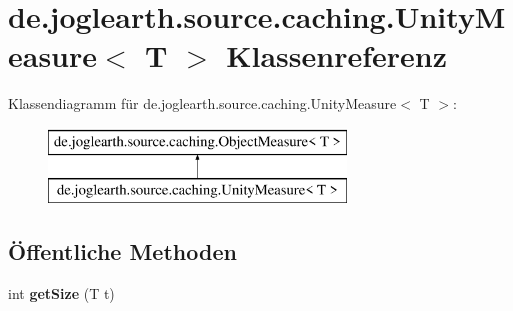 \section{de.\-joglearth.\-source.\-caching.\-Unity\-Measure$<$ T $>$ Klassenreferenz}
\label{classde_1_1joglearth_1_1source_1_1caching_1_1_unity_measure_3_01_t_01_4}
Klassendiagramm für de.\-joglearth.\-source.\-caching.\-Unity\-Measure$<$ T $>$\-:\begin{figure}[H]
\begin{center}
\leavevmode
\includegraphics[height=2.000000cm]{classde_1_1joglearth_1_1source_1_1caching_1_1_unity_measure_3_01_t_01_4}
\end{center}
\end{figure}
\subsection*{Öffentliche Methoden}
\begin{DoxyCompactItemize}
\item 
int {\bfseries get\-Size} (T t)\label{classde_1_1joglearth_1_1source_1_1caching_1_1_unity_measure_3_01_t_01_4_a2fe8769ef6b5b550d83169ef02eebb90}

\end{DoxyCompactItemize}
